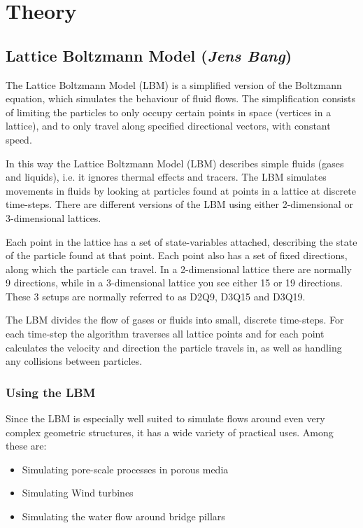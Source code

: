 \section{Theory}

\subsection{Lattice Boltzmann Model (\textit{Jens Bang})}
The Lattice Boltzmann Model (LBM) is a simplified version of the Boltzmann equation, which simulates the behaviour of fluid flows. The simplification consists of limiting the particles to only occupy certain points in space (vertices in a lattice), and to only travel along specified directional vectors, with constant speed. 

In this way the Lattice Boltzmann Model (LBM) describes simple fluids (gases and liquids), i.e. it ignores thermal effects and tracers. The LBM simulates movements in fluids by looking at particles found at points in a lattice at discrete time-steps. There are different versions of the LBM using either 2-dimensional or 3-dimensional lattices.

Each point in the lattice has a set of state-variables attached, describing the state of the particle found at that point. Each point also has a set of fixed directions, along which the particle can travel. In a 2-dimensional lattice there are normally 9 directions, while in a 3-dimensional lattice you see either 15 or 19 directions. These 3 setups are normally referred to as D2Q9, D3Q15 and D3Q19.


The LBM divides the flow of gases or fluids into small, discrete time-steps. For each time-step the algorithm traverses all lattice points and for each point calculates the velocity and direction the particle travels in, as well as handling any collisions between particles.

\subsubsection{Using the LBM}\label{usingthelbm}
Since the LBM is especially well suited to simulate flows around even very complex geometric structures, it has a wide variety of practical uses. Among these are:
\begin{itemize}
\item Simulating pore-scale processes in porous media
\item Simulating Wind turbines
\item Simulating the water flow around bridge pillars
\end{itemize}

